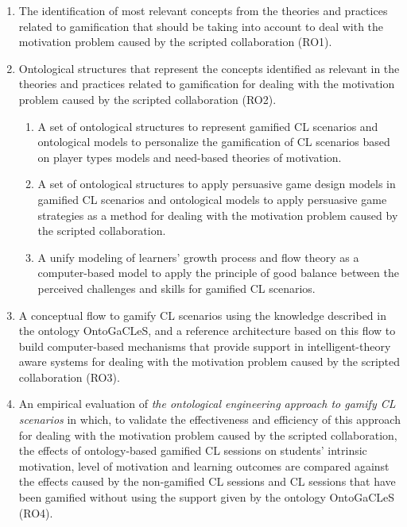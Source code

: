\begin{enumerate}
\item 
The identification of most relevant concepts from the theories and practices related to gamification that should be taking into account to deal with the motivation problem caused by the scripted collaboration (RO1).

\item
Ontological structures that represent the concepts identified as relevant in the theories and practices related to gamification for dealing with the motivation problem caused by the scripted collaboration (RO2).

\begin{enumerate}
\item
A set of ontological structures to represent gamified CL scenarios and ontological models to personalize the gamification of CL scenarios based on player types models and need-based theories of motivation.

\item
A set of ontological structures to apply persuasive game design models in gamified CL scenarios and ontological models to apply persuasive game strategies as a method for dealing with the motivation problem caused by the scripted collaboration.

\item 
A unify modeling of learners' growth process and flow theory as a computer-based model to apply the principle of good balance between the perceived challenges and skills for gamified CL scenarios.
\end{enumerate}

\item
A conceptual flow to gamify CL scenarios using the knowledge described in the ontology OntoGaCLeS, and a reference architecture based on this flow to build computer-based mechanisms that provide support in intelligent-theory aware systems for dealing with the motivation problem caused by the scripted collaboration (RO3).

\item
An empirical evaluation of \emph{the ontological engineering approach to gamify CL scenarios} in which, to validate the effectiveness and efficiency of this approach for dealing with the motivation problem caused by the scripted collaboration, the effects of ontology-based gamified CL sessions on students' intrinsic motivation, level of motivation and learning outcomes are compared against the effects caused by the non-gamified CL sessions and CL sessions that have been gamified without using the support given by the ontology OntoGaCLeS (RO4).
\end{enumerate}

